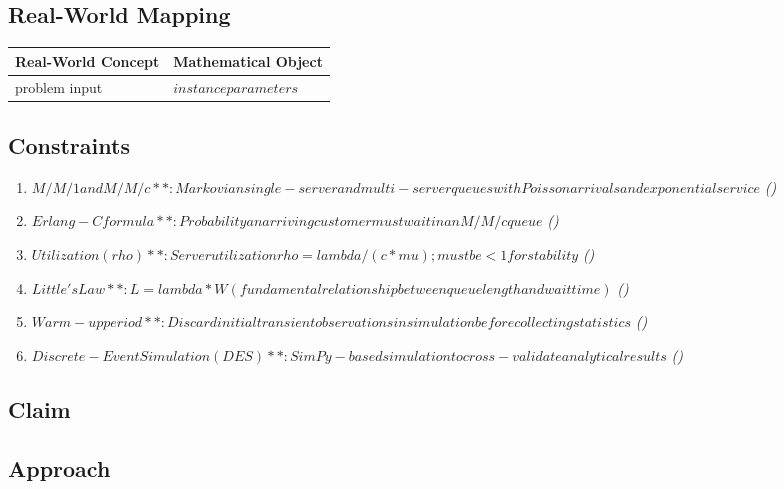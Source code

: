 \documentclass[11pt, a4paper]{article}
\begin{document}
\subsection{Real-World Mapping}

\begin{longtable}{ll}
\toprule
\textbf{Real-World Concept} & \textbf{Mathematical Object} \\
\midrule
\endhead
problem input & $instance parameters$ \\
\bottomrule
\end{longtable}

\subsection{Constraints}

\begin{enumerate}
  \item $M/M/1 and M/M/c**: Markovian single-server and multi-server queues with Poisson arrivals and exponential service$
  \hfill \textit{()}
  \item $Erlang-C formula**: Probability an arriving customer must wait in an M/M/c queue$
  \hfill \textit{()}
  \item $Utilization (rho)**: Server utilization rho = lambda / (c * mu); must be < 1 for stability$
  \hfill \textit{()}
  \item $Little's Law**: L = lambda * W (fundamental relationship between queue length and wait time)$
  \hfill \textit{()}
  \item $Warm-up period**: Discard initial transient observations in simulation before collecting statistics$
  \hfill \textit{()}
  \item $Discrete-Event Simulation (DES)**: SimPy-based simulation to cross-validate analytical results$
  \hfill \textit{()}
\end{enumerate}

\subsection{Claim}


\subsection{Approach}
\end{document}
